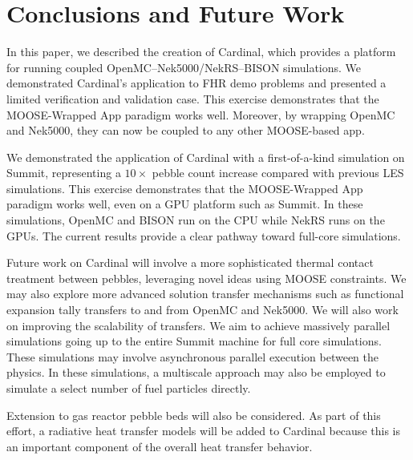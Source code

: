 \section{Conclusions and Future Work}
\label{s:sum}


In this paper, we described the creation of Cardinal, which provides a platform for running coupled
OpenMC--Nek5000/NekRS--BISON simulations. We demonstrated Cardinal's application to FHR demo problems and
presented a limited verification and validation case. This exercise demonstrates that the MOOSE-Wrapped App
paradigm works well. Moreover, by wrapping OpenMC and Nek5000, they can now be coupled to any other MOOSE-based app.

We demonstrated the application of Cardinal with a first-of-a-kind simulation on Summit, representing a $10\times$ pebble count increase compared with previous LES simulations. This exercise demonstrates that the MOOSE-Wrapped App paradigm works well, even on a GPU platform such as Summit. In these simulations, OpenMC and BISON run on the CPU while NekRS runs on the GPUs. The current results provide a clear pathway toward full-core simulations.

Future work on Cardinal will involve a more sophisticated thermal contact treatment between pebbles,
leveraging novel ideas using MOOSE constraints. We may also explore more advanced solution transfer
mechanisms such as functional expansion tally transfers to and from OpenMC and Nek5000. We
will also work on improving the scalability of transfers. We aim to achieve massively parallel simulations going up to the entire Summit machine for full core simulations. These simulations may involve asynchronous parallel execution between the
physics. In these simulations, a multiscale approach may also be employed to simulate a select number of fuel particles directly.

Extension to gas reactor pebble beds will also be considered. As part of this effort, a radiative heat transfer models will be added to Cardinal because this is an important component of the overall heat transfer behavior.
